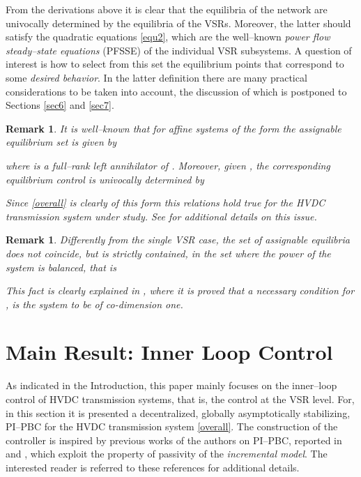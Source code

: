 \documentclass[5p,twocolumn]{elsarticle}
\newtheorem{remark}[theorem]{Remark}
\numberwithin{equation}{section}
\begin{document}
From the derivations above it is clear that the equilibria of the network are univocally determined by the equilibria of the VSRs. Moreover, the latter should satisfy the quadratic equations \eqref{equ2},
which are the well--known \textit{power flow steady--state equations} (PFSSE) of the individual VSR subsystems. A question of  interest is how to select from this set the equilibrium points that correspond to some {\em desired behavior}. In the latter definition there are many practical considerations to be taken into account, the discussion of which is postponed to Sections \ref{sec6} and \ref{sec7}.

\begin{remark}\em
\label{remU}
It is well--known that for affine systems of the form  the assignable equilibrium set is given by

where  is a full--rank left annihilator of . Moreover, given , the corresponding equilibrium control  is {\em univocally} determined by

Since \eqref{overall} is clearly of this form this relations hold true for the HVDC transmission system under study. See  \cite{sanchez} for additional details on this issue.
\end{remark}

\begin{remark}\em
Differently from the single VSR case, the set of assignable equilibria does not coincide, but is strictly contained, in the set where the power of the system is balanced, that is

This fact is clearly explained in \cite{sanchez}, where it is proved that a necessary condition for , is the system to be of co-dimension one.
\end{remark}

\section{Main Result: Inner Loop Control}
\label{main}
As indicated in the Introduction, this paper mainly focuses on the inner--loop control of HVDC transmission systems, that is, the control at the VSR level. For, in this
section it is presented a decentralized, globally asymptotically stabilizing, PI--PBC for the HVDC transmission system \eqref{overall}. The construction of the controller is inspired by previous works of the authors on PI--PBC, reported
in \cite{HERetal} and \cite{JAYetal}, which exploit the property of passivity of the \textit{incremental model}. The interested reader is referred to these references for additional details.
\end{document}
